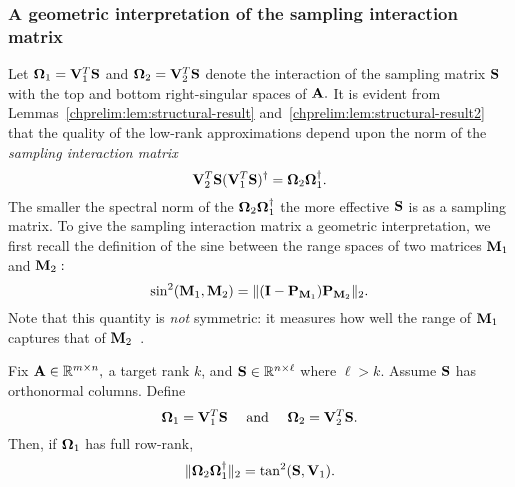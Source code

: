 \subsubsection{A geometric interpretation of the sampling interaction matrix}
Let $\mathbf{\Omega}_1 = \mathbf{V}_1^T \mathbf{S}$ and $\mathbf{\Omega}_2 = \mathbf{V}_2^T \mathbf{S}$
denote the interaction of the sampling matrix $\mathbf{S}$ with the top and bottom
right-singular spaces of $\mathbf{A}.$ It is evident from Lemmas~\ref{chprelim:lem:structural-result}
and~\ref{chprelim:lem:structural-result2} that the quality of the low-rank approximations
depend upon the norm of the \emph{sampling interaction matrix}
\[
 \mathbf{V}_2^T \mathbf{S} (\mathbf{V}_1^T \mathbf{S})^\dagger = \mathbf{\Omega}_2 \mathbf{\Omega}_1^\dagger.
\]
The smaller the spectral norm of the 
$\mathbf{\Omega}_2 \mathbf{\Omega}_1^\dagger$ the more effective 
$\mathbf{S}$ is as a sampling matrix. 
To give the sampling interaction matrix a geometric interpretation,
we first recall the definition of the sine between the range spaces
of two matrices $\mathbf{M}_1$ and $\mathbf{M}_2:$
\[
 \sin^2(\mathbf{M}_1, \mathbf{M}_2) = \|(\mathbf{I} - \mathbf{P}_{\mathbf{M}_1}) \mathbf{P}_{\mathbf{M}_2}\|_2.
\]
Note that this quantity is \emph{not} symmetric: it measures how well the 
range of $\mathbf{M}_1$ captures that of $\mathbf{M}_2$~\cite[Chapter 12]{GL96}.

\begin{lemma}
 Fix $\mathbf{A} \in \mathbb{R}^{m \times n},$ a target rank $k$, and $\mathbf{S} \in \mathbb{R}^{n \times \ell}$ where $\ell > k.$
 Assume $\mathbf{S}$ has orthonormal columns. Define
 \[
  \mathbf{\Omega}_1 = \mathbf{V}_1^T \mathbf{S} \quad \text{ and } \quad \mathbf{\Omega}_2 = \mathbf{V}_2^T \mathbf{S}.
 \]
Then, if $\mathbf{\Omega}_1$ has full row-rank,
 \[
  \|\mathbf{\Omega}_2 \mathbf{\Omega}_1^\dagger\|_2 = \tan^2(\mathbf{S}, \mathbf{V}_1).
 \]
\end{lemma}

